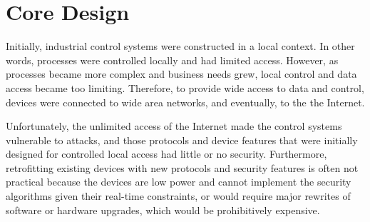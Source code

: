 \documentclass[conference]{IEEEtran}
\begin{document}
\section{Core Design}
Initially, industrial control systems were constructed in a local context.  In other words, processes were controlled locally and had limited access.  However, as processes became more complex and business needs grew, local control and data access became too limiting.  Therefore, to provide wide access to data and control, devices were connected to wide area networks, and eventually, to the the Internet.

Unfortunately, the unlimited access of the Internet made the control systems vulnerable to attacks, and those protocols and device features that were initially designed for controlled local access had little or no security.  Furthermore, retrofitting existing devices with new protocols and security features is often not practical because the devices are low power and cannot implement the security algorithms given their real-time constraints, or would require major rewrites of software or hardware upgrades, which would be prohibitively expensive.

\end{document}
